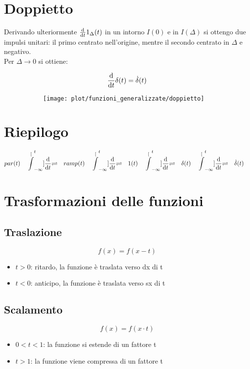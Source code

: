 \documentclass[../main.tex]{subfiles}
\begin{document}
	\section{Doppietto}
	Derivando ulteriormente $\frac{\mathrm{d} }{\mathrm{d} t}1_{\Delta}(t)$ in un intorno $I(0)$ e in $I(\Delta)$ si ottengo due impulsi unitari: il primo centrato nell'origine, mentre il secondo centrato in $\Delta$ e negativo.\\
	Per $\Delta \longrightarrow 0$ si ottiene:
	\begin{figure}[h!]
		\centering
		\begin{subfigure}{0.5\textwidth}
			\[
			\frac{\mathrm{d} }{\mathrm{d} t} \delta(t) = \dot{\delta}(t)
			\]
		\end{subfigure}
		\begin{subfigure}{0.4\textwidth}
			\texttt{[image: plot/funzioni\_generalizzate/doppietto]}
		\end{subfigure}
	\end{figure}
	\newpage
	\section{Riepilogo}
	$$ 
	par(t) \quad \stackrel[\int_{-\infty}^{t}]{\frac{\mathrm{d} }{\mathrm{d} t}}{\rightleftharpoons} 
	\quad ramp(t) \quad
	\stackrel[\int_{-\infty}^{t}]{\frac{\mathrm{d} }{\mathrm{d} t}}{\rightleftharpoons}
	\quad 1(t) \quad
	\stackrel[\int_{-\infty}^{t}]{\frac{\mathrm{d} }{\mathrm{d} t}}{\rightleftharpoons}
	\quad \delta (t) \quad
	\stackrel[\int_{-\infty}^{t}]{\frac{\mathrm{d} }{\mathrm{d} t}}{\rightleftharpoons}
	\quad \dot{\delta}(t) \quad
	$$
	\section{Trasformazioni delle funzioni}
	\subsection{Traslazione}
	$$ f(x) = f(x - t) $$
	\begin{itemize}
		\item $ t>0 $: ritardo, la funzione è traslata verso dx di t
		\item $ t<0 $: anticipo, la funzione è traslata verso sx di t 	
	\end{itemize}
	\subsection{Scalamento}
	$$ f(x) = f(x \cdotp t) $$
	\begin{itemize}
		\item $ 0<t<1 $: la funzione si estende di un fattore t
		\item $ t>1 $: la funzione viene compressa di un fattore t  	
	\end{itemize}
\end{document}

